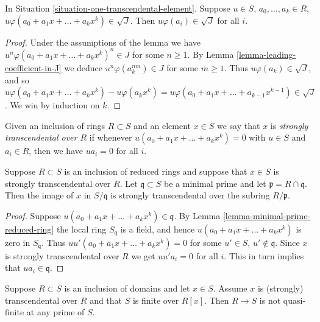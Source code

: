 \begin{lemma}
\label{lemma-all-coefficients-in-J}
In Situation \ref{situation-one-transcendental-element}.
Suppose $u \in S$, $a_0, \ldots, a_k \in R$,
$u \varphi(a_0 + a_1x + \ldots + a_k x^k) \in \sqrt{J}$.
Then $u \varphi(a_i) \in \sqrt{J}$ for all $i$.
\end{lemma}

\begin{proof}
Under the assumptions of the lemma we have
$u^n \varphi(a_0 + a_1x + \ldots + a_k x^k)^n \in J$ for
some $n \geq 1$. By Lemma \ref{lemma-leading-coefficient-in-J}
we deduce $u^n \varphi(a_k^{nm}) \in J$ for some $m \geq 1$.
Thus $u \varphi(a_k) \in \sqrt{J}$, and so
$u \varphi(a_0 + a_1x + \ldots + a_k x^k) - u \varphi(a_k x^k) =
u \varphi(a_0 + a_1x + \ldots + a_{k-1} x^{k-1}) \in \sqrt{J}$.
We win by induction on $k$.
\end{proof}

\begin{definition}
\label{definition-strongly-transcendental}
Given an inclusion of rings $R \subset S$ and
an element $x \in S$ we say that $x$ is
{\it strongly transcendental over $R$} if
whenever $u(a_0 + a_1 x + \ldots + a_k x^k) = 0$
with $u \in S$ and $a_i \in R$, then
we have $ua_i = 0$ for all $i$.
\end{definition}

\begin{lemma}
\label{lemma-reduced-strongly-transcendental-minimal-prime}
Suppose $R \subset S$ is an inclusion of reduced rings
and suppose that $x \in S$ is strongly transcendental over $R$.
Let $\mathfrak q \subset S$ be a minimal prime
and let $\mathfrak p = R \cap \mathfrak q$.
Then the image of $x$ in $S/\mathfrak q$ is strongly
transcendental over the subring $R/\mathfrak p$.
\end{lemma}

\begin{proof}
Suppose $u(a_0 + a_1x + \ldots + a_k x^k) \in \mathfrak q$.
By Lemma \ref{lemma-minimal-prime-reduced-ring}
the local ring $S_{\mathfrak q}$ is a field,
and hence $u(a_0 + a_1x + \ldots + a_k x^k) $ is zero
in $S_{\mathfrak q}$. Thus $uu'(a_0 + a_1x + \ldots + a_k x^k) = 0$
for some $u' \in S$, $u' \not\in \mathfrak q$.
Since $x$ is strongly transcendental over $R$ we get
$uu'a_i = 0$ for all $i$. This in turn implies
that $ua_i \in \mathfrak q$.
\end{proof}

\begin{lemma}
\label{lemma-domains-transcendental-not-quasi-finite}
Suppose $R\subset S$ is an inclusion of domains and
let $x \in S$. Assume $x$ is (strongly) transcendental over $R$
and that $S$ is finite over $R[x]$. Then $R \to S$ is not
quasi-finite at any prime of $S$.
\end{lemma}

